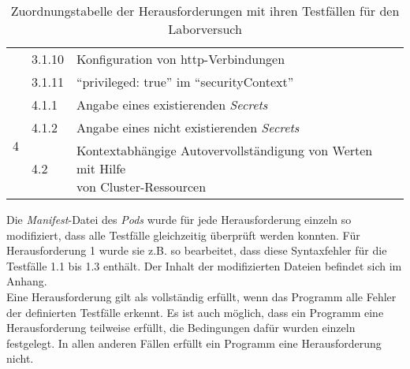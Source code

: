 \begin{table}[t]
\begin{tabularx}{\columnwidth}{lllX}
                                                                                     & 3.1.10                                                              & Konfiguration von \ac{http}-Verbindungen                                 \\
                                                                                     & 3.1.11                                                              & ``privileged: true'' im ``securityContext''                              \\
        \midrule
        \multirow{3}{*}{4}                                                           & 4.1.1                                                               & Angabe eines existierenden \textit{Secrets}                              \\
                                                                                     & 4.1.2                                                               & Angabe eines nicht existierenden \textit{Secrets}                        \\
                                                                                     & 4.2                                                                 & \makecell[l]{Kontextabhängige Autovervollständigung von Werten mit Hilfe \\ von Cluster-Ressourcen} \\

        \bottomrule
    \end{tabularx}
    \caption{Zuordnungstabelle der Herausforderungen mit ihren Testfällen für den Laborversuch}
    \label{tbl:test-cases-experiment}
\end{table}
Die \textit{Manifest}-Datei des \textit{Pods} wurde für jede Herausforderung einzeln so modifiziert, dass alle Testfälle gleichzeitig überprüft werden konnten.
Für Herausforderung 1 wurde sie z.B. so bearbeitet, dass diese Syntaxfehler für die Testfälle 1.1 bis 1.3 enthält.
Der Inhalt der modifizierten Dateien befindet sich im Anhang.
\\
Eine Herausforderung gilt als vollständig erfüllt, wenn das Programm alle Fehler der definierten Testfälle erkennt.
Es ist auch möglich, dass ein Programm eine Herausforderung teilweise erfüllt, die Bedingungen dafür wurden einzeln festgelegt.
In allen anderen Fällen erfüllt ein Programm eine Herausforderung nicht.

